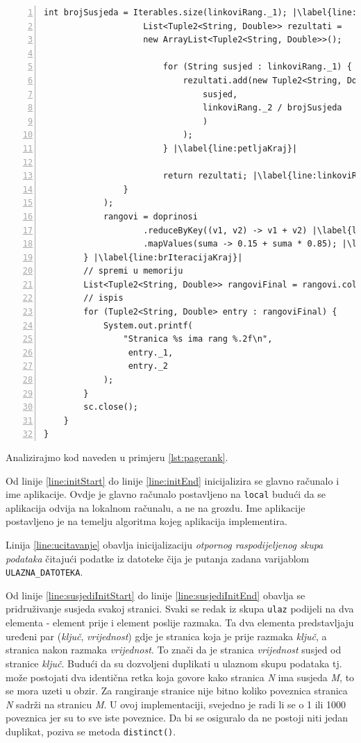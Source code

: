 \documentclass[times, utf8, zavrsni, numeric]{fer}
\begin{document}
\begin{lstlisting}[numbers=left, label={lst:pagerank}, caption={Algoritam \emph{PageRank}.}, escapechar=|]
					int brojSusjeda = Iterables.size(linkoviRang._1); |\label{line:brojSusjeda}|
					List<Tuple2<String, Double>> rezultati = 
					new ArrayList<Tuple2<String, Double>>();
					
						for (String susjed : linkoviRang._1) { |\label{line:petljaStart}|
							rezultati.add(new Tuple2<String, Double>(
								susjed,
								linkoviRang._2 / brojSusjeda
								)
							);
						} |\label{line:petljaKraj}|
						
						return rezultati; |\label{line:linkoviRangKraj}|					
				}
			);
			rangovi = doprinosi
					.reduceByKey((v1, v2) -> v1 + v2) |\label{line:zbrojPoKljucu}|
					.mapValues(suma -> 0.15 + suma * 0.85); |\label{line:postaviRang}|
		} |\label{line:brIteracijaKraj}|
		// spremi u memoriju
		List<Tuple2<String, Double>> rangoviFinal = rangovi.collect(); |\label{line:spremanjePodataka}|
		// ispis
		for (Tuple2<String, Double> entry : rangoviFinal) {
			System.out.printf(
				"Stranica %s ima rang %.2f\n",
				 entry._1,
				 entry._2
			);
		}
		sc.close();
	}
}
\end{lstlisting}
\vspace{5mm}

Analizirajmo kod naveden u primjeru \ref{lst:pagerank}. 

Od linije \ref{line:initStart} do linije \ref{line:initEnd} inicijalizira se glavno računalo i ime aplikacije. Ovdje je glavno računalo postavljeno na \texttt{local} budući da se aplikacija odvija na lokalnom računalu, a ne na grozdu. Ime aplikacije postavljeno je na temelju algoritma kojeg aplikacija implementira.

Linija \ref{line:ucitavanje} obavlja inicijalizaciju \emph{otpornog raspodijeljenog skupa podataka} čitajući podatke iz datoteke čija je putanja zadana varijablom \texttt{ULAZNA\_DATOTEKA}.

Od linije \ref{line:susjediInitStart} do linije \ref{line:susjediInitEnd} obavlja se pridruživanje susjeda svakoj stranici. Svaki se redak iz skupa \texttt{ulaz} podijeli na dva elementa - element prije i element poslije razmaka. Ta dva elementa predstavljaju uređeni par (\emph{ključ}, \emph{vrijednost}) gdje je stranica koja je prije razmaka \emph{ključ}, a stranica nakon razmaka \emph{vrijednost}. To znači da je stranica \emph{vrijednost} susjed od stranice \emph{ključ}. Budući da su dozvoljeni duplikati u ulaznom skupu podataka tj. može postojati dva identična retka koja govore kako stranica \emph{N} ima susjeda \emph{M}, to se mora uzeti u obzir. Za rangiranje stranice nije bitno koliko poveznica stranica \emph{N} sadrži na stranicu \emph{M}. U ovoj implementaciji, svejedno je radi li se o 1 ili 1000 poveznica jer su to sve iste poveznice. Da bi se osiguralo da ne postoji niti jedan duplikat, poziva se metoda \texttt{distinct()}.
\end{document}
